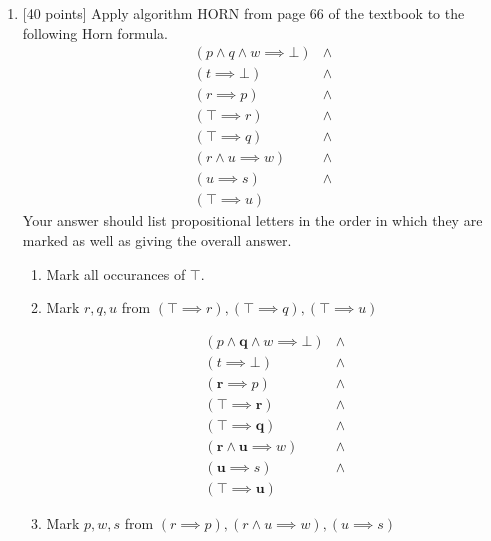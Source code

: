 \documentclass{article}
\begin{document}
\begin{enumerate}
  \item {[40 points]} Apply algorithm HORN from page 66 of the textbook
    to the following Horn formula.
  \begin{displaymath}
    \begin{array}{ll}
    (p \land q \land w \implies \bot) &\land \\
    (t \implies \bot) &\land \\
    (r \implies p) &\land \\
    (\top \implies r) &\land \\
    (\top \implies q) &\land \\
    (r \land u \implies w) &\land \\
    (u \implies s) &\land \\
    (\top \implies u)
    \end{array}
  \end{displaymath}
Your answer should list propositional letters in the order in which
they are marked as well as giving the overall answer.

\begin{answer}
	\begin{enumerate}
	  \item Mark all occurances of $\top$.
	  	
	  \item Mark $r, q, u$ from $(\top \implies r), (\top \implies q),
	  (\top \implies u)$
	  
		\begin{displaymath}
    		\begin{array}{ll}
   				(p \land \textbf{q} \land w \implies \bot) &\land \\
    			(t \implies \bot) &\land \\
    			(\textbf{r} \implies p) &\land \\
    			(\top \implies \textbf{r}) &\land \\
    			(\top \implies \textbf{q}) &\land \\
    			(\textbf{r} \land \textbf{u} \implies w) &\land \\
    			(\textbf{u} \implies s) &\land \\
    			(\top \implies \textbf{u})
    		\end{array}
  		\end{displaymath}
  		\item Mark $p, w, s$ from $(r \implies p), (r \land u \implies w), (u
  		\implies s)$
  		

\end{enumerate}
\end{answer}
\end{enumerate}
\end{document}
